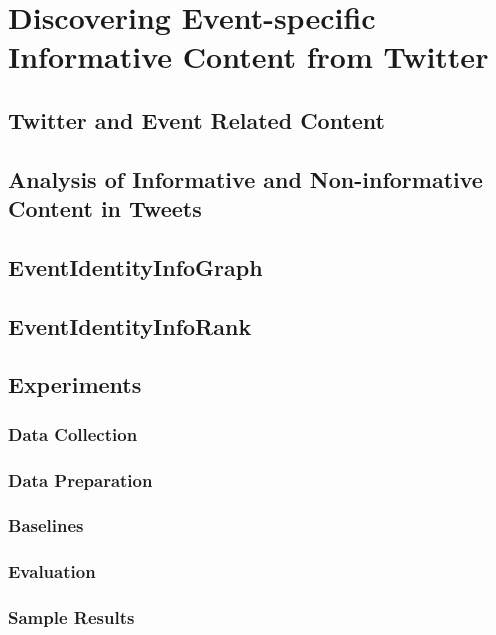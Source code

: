 
\chapter{Discovering Event-specific Informative Content from Twitter} %

\label{TwitterStudy} %


\section{Twitter and Event Related Content}

\section{Analysis of Informative and Non-informative Content in Tweets}

\section{EventIdentityInfoGraph}

\section{EventIdentityInfoRank}

\section{Experiments}

\subsection{Data Collection}

\subsection{Data Preparation}

\subsection{Baselines}

\subsection{Evaluation}

\subsection{Sample Results}